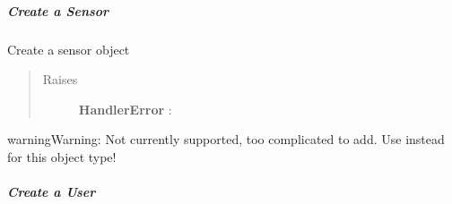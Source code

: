 \documentclass[letterpaper,10pt,english]{sphinxmanual}
\begin{document}
\subparagraph{Create a Sensor}
\label{pytan.handler:create-a-sensor}

\begin{fulllineitems}
\label{pytan.handler:pytan.handler.Handler.create_sensor}
Create a sensor object
\begin{quote}\begin{description}
\item[{Raises}] \leavevmode
\textbf{HandlerError} : {\hyperref[pytan.utils:pytan.utils.HandlerError]{}}

\end{description}\end{quote}

\begin{notice}{warning}{Warning:}
Not currently supported, too complicated to add.
Use {\hyperref[pytan.handler:pytan.handler.Handler.create_from_json]{}} instead for this object type!
\end{notice}

\end{fulllineitems}



\subparagraph{Create a User}
\label{pytan.handler:create-a-user}
\end{document}
